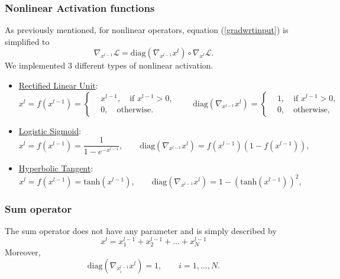 \documentclass{article}
\begin{document}
\subsubsection{Nonlinear Activation functions}
As previously mentioned, for nonlinear operators, equation (\ref{gradwrtinput}) is simplified to
\begin{equation*}
\nabla_{x^{l-1}}  \mathcal{L} = \text{diag} \left ( \nabla_{x^{l-1}}  x^{l} \right) \circ  \nabla_{x^l} \mathcal{L}.
\end{equation*}
We implemented 3 different types of nonlinear activation. 
\begin{itemize}
\item \underline{Rectified Linear Unit}:
\begin{equation*}
x^{l} = f(x^{l-1})
= 
\begin{cases}
&x^{l-1}, \quad \text{if } x^{l-1}>0, \\
&0, \quad \text{otherwise}.
\end{cases}
\qquad 
\text{diag} \left ( \nabla_{x^{l-1}}  x^{l} \right) = 
\begin{cases}
&1, \quad \text{if } x^{l-1}>0, \\
&0, \quad \text{otherwise},
\end{cases}
\end{equation*}
\item \underline{Logistic Sigmoid}:
\begin{equation*}
x^{l} = f(x^{l-1})
= 
\dfrac{1}{1-e^{-x^{l-1}}},
\qquad
\text{diag} \left ( \nabla_{x^{l-1}}  x^{l} \right) = 
f(x^{l-1})(1-f(x^{l-1})),
\end{equation*}
\item \underline{Hyperbolic Tangent}:
\begin{equation*}
x^{l} = f(x^{l-1})
= 
\text{tanh}(x^{l-1}),
\qquad
\text{diag} \left ( \nabla_{x^{l-1}}  x^{l} \right) = 
1-(\text{tanh}(x^{l-1}))^2,
\end{equation*}
\end{itemize}
\subsubsection{Sum operator}
The sum operator does not have any parameter and is simply described by
\begin{equation*}
x^{l} = x_1^{l-1} + x_2^{l-1} + \dots + x_N^{l-1}
\end{equation*}
Moreover,
\begin{equation*}
\text{diag} \left ( \nabla_{x_i^{l-1}}  x^{l} \right) = 1, \qquad i=1,\dots,N.
\end{equation*}
\end{document}
